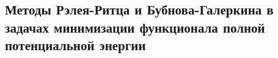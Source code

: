 

\subsection{Методы Рэлея-Ритца и Бубнова-Галеркина в задачах минимизации функционала полной потенциальной энергии}



